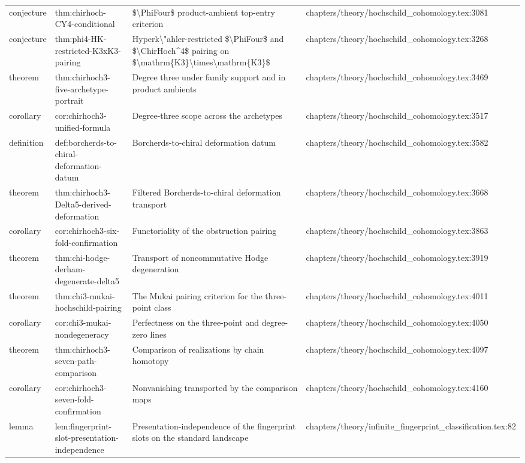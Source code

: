 \documentclass[11pt]{article}
\begin{document}
\begin{longtable}{L{0.10\textwidth}L{0.26\textwidth}L{0.42\textwidth}L{0.22\textwidth}}
conjecture & thm:chirhoch-CY4-cond{}itional & \$\textbackslash{}PhiFour\$ product-ambient top-entry criterion & chapters/theory/hochschild\_cohomology.tex:3081\\
conjecture & thm:phi4-HK-restricted-K3xK3-pairing & Hyperk\textbackslash{}"ahler-restricted \$\textbackslash{}PhiFour\$ and \$\textbackslash{}ChirHoch\textasciicircum{}4\$ pairing on \$\textbackslash{}mathrm\{K3\}\textbackslash{}times\textbackslash{}mathrm\{K3\}\$ & chapters/theory/hochschild\_cohomology.tex:3268\\
theorem & thm:chirhoch3-five-archetype-portrait & Degree three under family support and in product ambients & chapters/theory/hochschild\_cohomology.tex:3469\\
corollary & cor:chirhoch3-unified-formula & Degree-three scope across the archetypes & chapters/theory/hochschild\_cohomology.tex:3517\\
definition & def:borcherds-to-chiral-deformation-datum & Borcherds-to-chiral deformation datum & chapters/theory/hochschild\_cohomology.tex:3582\\
theorem & thm:chirhoch3-Delta5-derived-deformation & Filtered Borcherds-to-chiral deformation transport & chapters/theory/hochschild\_cohomology.tex:3668\\
corollary & cor:chirhoch3-six-fold-confirmation & Functoriality of the obstruction pairing & chapters/theory/hochschild\_cohomology.tex:3863\\
theorem & thm:chi-hodge-derham-degenerate-delta5 & Transport of noncommutative Hodge degeneration & chapters/theory/hochschild\_cohomology.tex:3919\\
theorem & thm:chi3-mukai-hochschild-pairing & The Mukai pairing criterion for the three-point class & chapters/theory/hochschild\_cohomology.tex:4011\\
corollary & cor:chi3-mukai-nondegeneracy & Perfectness on the three-point and degree-zero lines & chapters/theory/hochschild\_cohomology.tex:4050\\
theorem & thm:chirhoch3-seven-path-comparison & Comparison of realizations by chain homotopy & chapters/theory/hochschild\_cohomology.tex:4097\\
corollary & cor:chirhoch3-seven-fold-confirmation & Nonvanishing transported by the comparison maps & chapters/theory/hochschild\_cohomology.tex:4160\\
lemma & lem:fingerprint-slot-presentation-independence & Presentation-independence of the fingerprint slots on the standard landscape & chapters/theory/infinite\_fingerprint\_classification.tex:82\\

\end{longtable}
\end{document}
